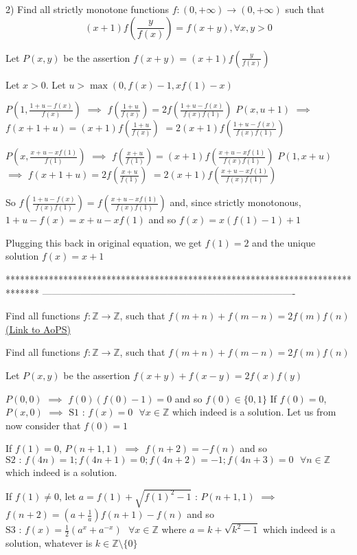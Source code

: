 \begin{solution}
	\begin{tcolorbox}2) Find all strictly monotone functions $f:(0,+\infty)\to(0,+\infty)$ such that
\[(x+1)f(\dfrac{y}{f(x)})=f(x+y),\forall x,y>0\]\end{tcolorbox}
Let $P(x,y)$ be the assertion $f(x+y)=(x+1)f(\frac y{f(x)})$

Let $x>0$. Let $u>\max(0,f(x)-1,xf(1)-x)$

$P(1,\frac{1+u-f(x)}{f(x)})$ $\implies$  $f(\frac {1+u}{f(x)})=2f(\frac{1+u-f(x)}{f(x)f(1)})$
$P(x,u+1)$ $\implies$ $f(x+1+u)=(x+1)f(\frac {1+u}{f(x)})$ $=2(x+1)f(\frac{1+u-f(x)}{f(x)f(1)})$


$P(x,\frac{x+u-xf(1)}{f(1)})$ $\implies$  $f(\frac {x+u}{f(1)})=(x+1)f(\frac{x+u-xf(1)}{f(x)f(1)})$
$P(1,x+u)$ $\implies$ $f(x+1+u)=2f(\frac {x+u}{f(1)})$ $=2(x+1)f(\frac{x+u-xf(1)}{f(x)f(1)})$


So $f(\frac{1+u-f(x)}{f(x)f(1)})=f(\frac{x+u-xf(1)}{f(x)f(1)})$ and, since strictly monotonous, $1+u-f(x)=x+u-xf(1)$ and so $f(x)=x(f(1)-1)+1$

Plugging this back in original equation, we get $f(1)=2$ and the unique solution $\boxed{f(x)=x+1}$
\end{solution}
*******************************************************************************
-------------------------------------------------------------------------------

\begin{problem}
	Find all functions $ f:\mathbb{Z}\rightarrow\mathbb{Z} $, such that $ f(m+n)+f(m-n)=2f(m)f(n) $
	\flushright \href{https://artofproblemsolving.com/community/c6h614885}{(Link to AoPS)}
\end{problem}



\begin{solution}
	\begin{tcolorbox}Find all functions $ f:\mathbb{Z}\rightarrow\mathbb{Z} $, such that $ f(m+n)+f(m-n)=2f(m)f(n) $\end{tcolorbox}
Let $P(x,y)$ be the assertion $f(x+y)+f(x-y)=2f(x)f(y)$

$P(0,0)$ $\implies$ $f(0)(f(0)-1)=0$ and so $f(0)\in\{0,1\}$
If $f(0)=0$, $P(x,0)$ $\implies$ $\boxed{\text{S1 : }f(x)=0\text{ }\forall x\in\mathbb Z}$ which indeed is a solution.
Let us from now consider that $f(0)=1$

If $f(1)=0$, $P(n+1,1)$ $\implies$ $f(n+2)=-f(n)$ and so
$\boxed{\text{S2 : }f(4n)=1;f(4n+1)=0;f(4n+2)=-1;f(4n+3)=0\text{ }\forall n\in\mathbb Z}$ which indeed is a solution.

If $f(1)\ne 0$, let $a=f(1)+\sqrt{f(1)^2-1}$ : 
$P(n+1,1)$ $\implies$ $f(n+2)=(a+\frac 1a)f(n+1)-f(n)$ and so 
$\boxed{\text{S3 : }f(x)=\frac 12\left(a^x+a^{-x}\right)\text{ }\forall x\in\mathbb Z}$ where  $a=k+\sqrt{k^2-1}$ which indeed is a solution, whatever is $k\in\mathbb Z\setminus\{0\}$
\end{solution}



